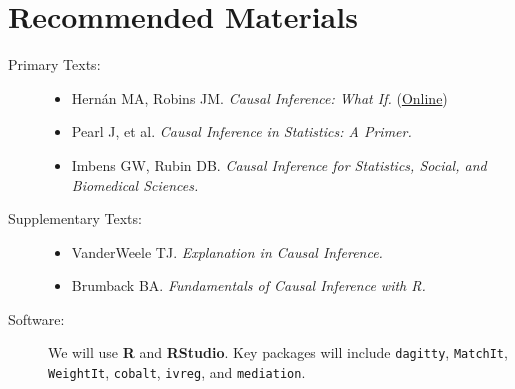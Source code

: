 \documentclass[11pt]{article}
\begin{document}
\vspace{6mm}
\section*{Recommended Materials}
\begin{description}
  \item[Primary Texts:]
    \begin{itemize}
      \item Hernán MA, Robins JM. \textit{Causal Inference: What If.} (\href{https://www.hsph.harvard.edu/miguel-hernan/causal-inference-book/}{Online})
      \item Pearl J, et al. \textit{Causal Inference in Statistics: A Primer.}
      \item Imbens GW, Rubin DB. \textit{Causal Inference for Statistics, Social, and Biomedical Sciences.}
    \end{itemize}
  \item[Supplementary Texts:]
    \begin{itemize}
      \item VanderWeele TJ. \textit{Explanation in Causal Inference.}
      \item Brumback BA. \textit{Fundamentals of Causal Inference with R.}
    \end{itemize}
  \item[Software:] We will use \textbf{R} and \textbf{RStudio}. Key packages will include \texttt{dagitty}, \texttt{MatchIt}, \texttt{WeightIt}, \texttt{cobalt}, \texttt{ivreg}, and \texttt{mediation}.
\end{description}

\vspace{6mm}
\end{document}
